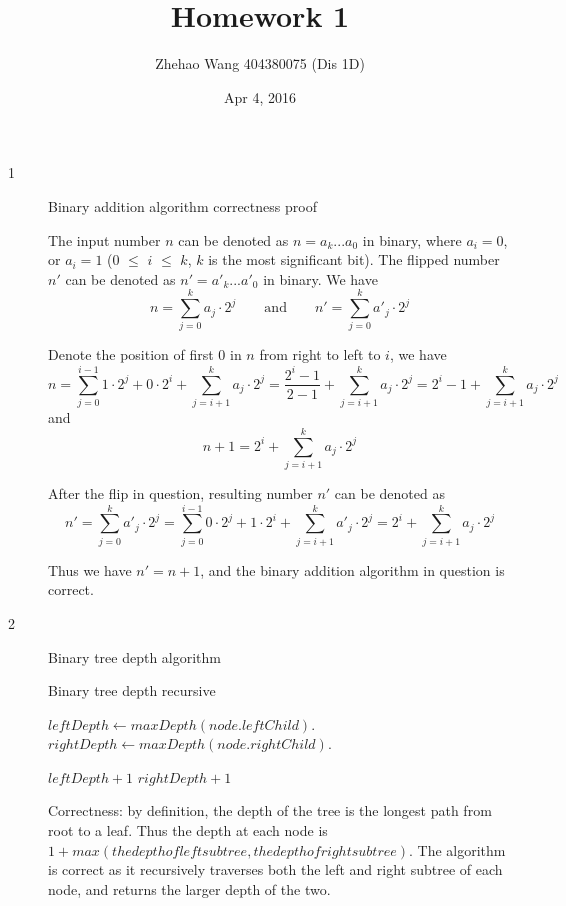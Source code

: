 \documentclass{article}
\title{Homework 1}
\author{Zhehao Wang 404380075 (Dis 1D)}
\date{Apr 4, 2016}
\begin{document}
\maketitle

\begin{description}

\item[1]{Binary addition algorithm correctness proof}
  
  The input number $n$ can be denoted as $n=a_k...a_0$ in binary, where $a_i=0$, or $a_i=1$ ($0$ $\leq$ $i$ $\leq$ $k$, $k$ is the most significant bit). The flipped number $n'$ can be denoted as  $n'=a'_k...a'_0$ in binary.
  We have 
  \[
  n = \sum_{j=0}^{k}{a_j \cdot 2^j}
  \qquad \text{and} \qquad 
  n' = \sum_{j=0}^{k}{a'_j \cdot 2^j}
  \]
  
  Denote the position of first $0$ in $n$ from right to left to $i$, we have 
  $$n = \sum_{j=0}^{i-1}{1 \cdot 2^j} + 0 \cdot 2^i + \sum_{j=i+1}^{k}{a_j \cdot 2^j} = \frac{2^i-1}{2-1} + \sum_{j=i+1}^{k}{a_j \cdot 2^j} = 2^i - 1 + \sum_{j=i+1}^{k}{a_j \cdot 2^j}$$ 
  and
  $$n + 1 = 2^i + \sum_{j=i+1}^{k}{a_j \cdot 2^j}$$

  After the flip in question, resulting number $n'$ can be denoted as
  $$n' = \sum_{j=0}^{k}{a'_j \cdot 2^j} = \sum_{j=0}^{i-1}{0 \cdot 2^j} + 1 \cdot 2^i + \sum_{j=i+1}^{k}{a'_j \cdot 2^j} = 2^i + \sum_{j=i+1}^{k}{a_j \cdot 2^j}$$

  Thus we have $n' = n + 1$, and the binary addition algorithm in question is correct.

\item[2]{Binary tree depth algorithm}

  \begin{algorithm}
  \caption{Binary tree depth recursive}
    \begin{algorithmic}[1]
        \State {}
      \EndIf

      \State $leftDepth \gets maxDepth(node.leftChild)$.
      \State $rightDepth \gets maxDepth(node.rightChild)$.

        \State \Return $leftDepth + 1$
      \Else {} 
        \State \Return $rightDepth + 1$
      \EndIf
    \EndFunction
    \end{algorithmic}
  \end{algorithm}

  Correctness: by definition, the depth of the tree is the longest path from root to a leaf. Thus the depth at each node is $1 + max(the depth of left subtree, the depth of right subtree)$. The algorithm is correct as it recursively traverses both the left and right subtree of each node, and returns the larger depth of the two.


\end{description}
\end{document}
